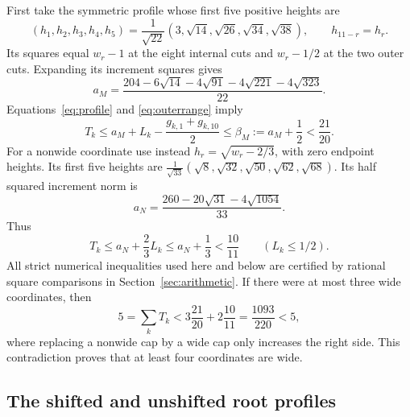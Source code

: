 \documentclass[11pt]{article}
\theoremstyle{definition}
\theoremstyle{remark}
\begin{document}
First take the symmetric profile whose first five positive heights are
\[
 (h_1,h_2,h_3,h_4,h_5)
   =\frac1{\sqrt{22}}(3,\sqrt{14},\sqrt{26},\sqrt{34},\sqrt{38}),
 \qquad h_{11-r}=h_r.
\]
Its squares equal $w_r-1$ at the eight internal cuts and $w_r-1/2$
at the two outer cuts. Expanding its increment squares gives
\[
 a_M=\frac{204-6\sqrt{14}-4\sqrt{91}-4\sqrt{221}-4\sqrt{323}}{22}.
\]
Equations~\eqref{eq:profile} and \eqref{eq:outerrange} imply
\begin{equation}\label{eq:modifiedcap}
 T_k\leq a_M+L_k-\frac{g_{k,1}+g_{k,10}}2
 \leq\beta_M:=a_M+\frac12<\frac{21}{20}.
\end{equation}
For a nonwide coordinate use instead $h_r=\sqrt{w_r-2/3}$,
with zero endpoint heights. Its first five heights are
$\frac1{\sqrt{33}}(\sqrt8,\sqrt{32},\sqrt{50},\sqrt{62},\sqrt{68})$.
Its half squared increment norm is
\[
 a_N=\frac{260-20\sqrt{31}-4\sqrt{1054}}{33}.
\]
Thus
\begin{equation}\label{eq:nonwidecap}
 T_k\leq a_N+\frac23L_k\leq a_N+\frac13<\frac{10}{11}
          \qquad(L_k\leq1/2).
\end{equation}
All strict numerical inequalities used here and below are certified by
rational square comparisons in Section~\ref{sec:arithmetic}.
If there were at most three wide coordinates, then
\[
 5=\sum_kT_k<3\frac{21}{20}+2\frac{10}{11}
    =\frac{1093}{220}<5,
\]
where replacing a nonwide cap by a wide cap only increases the right
side. This contradiction proves that at least four coordinates are wide.

\subsection{The shifted and unshifted root profiles}
\end{document}
